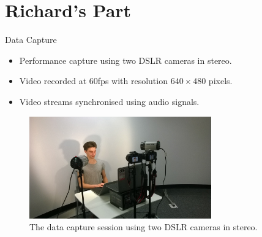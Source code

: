 \documentclass{beamer}
\begin{document}
\section{Richard's Part}
\begin{frame}{Data Capture}

\begin{itemize}
\setlength\itemsep{0.5em}
\item Performance capture using two DSLR cameras in stereo.
\item Video recorded at 60fps with resolution $640 \times 480$ pixels.
\item Video streams synchronised using audio signals.
\end{itemize}

\begin{center}
\begin{figure}
\includegraphics[width=0.7\textwidth]{img/setup1}
\caption{\tiny{The data capture session using two DSLR cameras in stereo.}}
\end{figure}
\end{center}

\end{frame}
\end{document}
